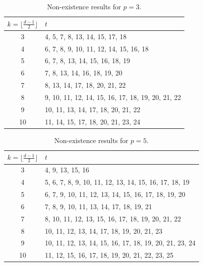 \documentclass[11pt]{amsart}
\theoremstyle{definition}
\begin{document}
\begin{table}[ht]
    \centering
\begin{tabular}{|c|p{}|}
	\hline
	$k=\lfloor \frac{d-1}2\rfloor$ & $t$ \\
	\hline
	3 & 4, 5, 7, 8, 13, 14, 15, 17, 18 \\
	\hline
	4 & 6, 7, 8, 9, 10, 11, 12, 14, 15, 16, 18 \\
	\hline
	5 & 6, 7, 8, 13, 14, 15, 16, 18, 19 \\
	\hline
	6 & 7, 8, 13, 14, 16, 18, 19, 20 \\
	\hline
	7 & 8, 13, 14, 17, 18, 20, 21, 22 \\
	\hline
	8 & 9, 10, 11, 12, 14, 15, 16, 17, 18, 19, 20, 21, 22 \\
	\hline
	9 & 10, 11, 13, 14, 17, 18, 20, 21, 22 \\
	\hline
	10 & 11, 14, 15, 17, 18, 20, 21, 23, 24 \\
	\hline
\end{tabular}
    \caption{Non-existence results for $p=3$.}
    \label{table:p=3}
\end{table}

\begin{table}[ht] 
    \centering
\begin{tabular}{|c|p{}|}
	\hline
	$k=\lfloor \frac{d-1}2\rfloor$ & $t$ \\
	\hline
	3 & 4, 9, 13, 15, 16 \\
	\hline
	4 & 5, 6, 7, 8, 9, 10, 11, 12, 13, 14, 15, 16, 17, 18, 19 \\
	\hline
	5 & 6, 7, 9, 10, 11, 12, 13, 14, 15, 16, 17, 18, 19, 20 \\
	\hline
	6 & 7, 8, 9, 10, 11, 13, 14, 17, 18, 19, 21 \\
	\hline
	7 & 8, 10, 11, 12, 13, 15, 16, 17, 18, 19, 20, 21, 22 \\
	\hline
	8 & 10, 11, 12, 13, 14, 17, 18, 19, 20, 21, 23 \\
	\hline
	9 & 10, 11, 12, 13, 14, 15, 16, 17, 18, 19, 20, 21, 23, 24 \\
	\hline
	10 & 11, 12, 15, 16, 17, 18, 19, 20, 21, 22, 23, 25 \\
	\hline
\end{tabular}
    \caption{Non-existence results for $p=5$.}
        \label{table:p=5}
\end{table}
\end{document}
